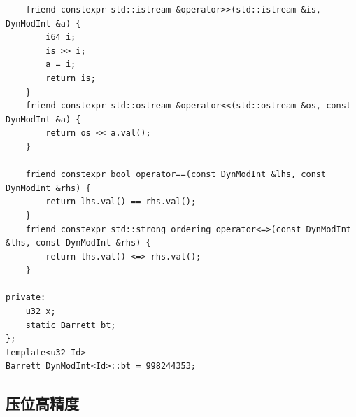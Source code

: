 \documentclass[UTF8,twoside]{ctexart}
\begin{document}
\begin{lstlisting}
    friend constexpr std::istream &operator>>(std::istream &is, DynModInt &a) {
        i64 i;
        is >> i;
        a = i;
        return is;
    }
    friend constexpr std::ostream &operator<<(std::ostream &os, const DynModInt &a) {
        return os << a.val();
    }

    friend constexpr bool operator==(const DynModInt &lhs, const DynModInt &rhs) {
        return lhs.val() == rhs.val();
    }
    friend constexpr std::strong_ordering operator<=>(const DynModInt &lhs, const DynModInt &rhs) {
        return lhs.val() <=> rhs.val();
    }

private:
    u32 x;
    static Barrett bt;
};
template<u32 Id>
Barrett DynModInt<Id>::bt = 998244353;
\end{lstlisting}
\subsection{压位高精度}
\end{document}
